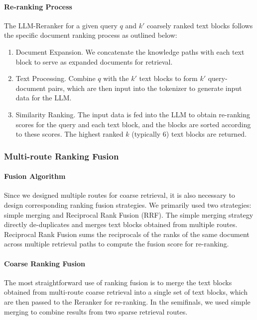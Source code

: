 \documentclass[11pt]{article}
\begin{document}
\paragraph{Re-ranking Process} The LLM-Reranker for a given query $q$ and $k'$ coarsely ranked text blocks follows the specific document ranking process as outlined below:
\begin{enumerate}
    \item Document Expansion. We concatenate the knowledge paths with each text block to serve as expanded documents for retrieval.
    \item Text Processing. Combine $q$ with the $k'$ text blocks to form $k'$ query-document pairs, which are then input into the tokenizer to generate input data for the LLM.
    \item Similarity Ranking. The input data is fed into the LLM to obtain re-ranking scores for the query and each text block, and the blocks are sorted according to these scores. The highest ranked $k$ (typically 6) text blocks are returned.
\end{enumerate}

\subsubsection{Multi-route Ranking Fusion}
\paragraph{Fusion Algorithm} Since we designed multiple routes for coarse retrieval, it is also necessary to design corresponding ranking fusion strategies. We primarily used two strategies: simple merging and Reciprocal Rank Fusion (RRF). The simple merging strategy directly de-duplicates and merges text blocks obtained from multiple routes. Reciprocal Rank Fusion sums the reciprocals of the ranks of the same document across multiple retrieval paths to compute the fusion score for re-ranking.

\paragraph{Coarse Ranking Fusion} The most straightforward use of ranking fusion is to merge the text blocks obtained from multi-route coarse retrieval into a single set of text blocks, which are then passed to the Reranker for re-ranking. In the semifinals, we used simple merging to combine results from two sparse retrieval routes.
\end{document}
